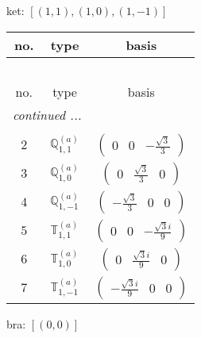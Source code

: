 \documentclass[fleqn,8pt,landscape]{jsarticle}
\begin{document}
\noindent
ket: $[(1,1),(1,0),(1,-1)]$
\begin{center}
\renewcommand{\arraystretch}{1.6}
\begin{longtable}{ccc}
 \hline \hline
no. & type & basis \\ \hline \endfirsthead

\multicolumn{2}{l}{\tablename\ \thetable{}} \\
 \hline \hline
no. & type & basis \\ \hline \endhead

 \hline \hline
\multicolumn{2}{r}{\footnotesize\it continued ...} \\ \endfoot

 \hline \hline
\multicolumn{2}{r}{} \\ \endlastfoot

$ 2 $ & $ \mathbb{Q}_{1,1}^{(a)} $ & $ \begin{pmatrix} 0 & 0 & - \frac{\sqrt{3}}{3} \end{pmatrix} $ \\ \hline
$ 3 $ & $ \mathbb{Q}_{1,0}^{(a)} $ & $ \begin{pmatrix} 0 & \frac{\sqrt{3}}{3} & 0 \end{pmatrix} $ \\ \hline
$ 4 $ & $ \mathbb{Q}_{1,-1}^{(a)} $ & $ \begin{pmatrix} - \frac{\sqrt{3}}{3} & 0 & 0 \end{pmatrix} $ \\ \hline
$ 5 $ & $ \mathbb{T}_{1,1}^{(a)} $ & $ \begin{pmatrix} 0 & 0 & - \frac{\sqrt{3} i}{9} \end{pmatrix} $ \\ \hline
$ 6 $ & $ \mathbb{T}_{1,0}^{(a)} $ & $ \begin{pmatrix} 0 & \frac{\sqrt{3} i}{9} & 0 \end{pmatrix} $ \\ \hline
$ 7 $ & $ \mathbb{T}_{1,-1}^{(a)} $ & $ \begin{pmatrix} - \frac{\sqrt{3} i}{9} & 0 & 0 \end{pmatrix} $ \\
\end{longtable}
\end{center}
bra: $[(0,0)]$
\end{document}
